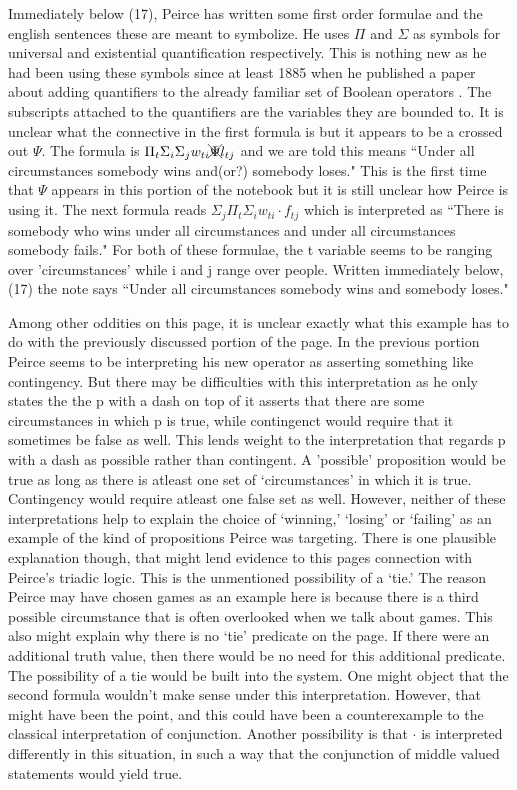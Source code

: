 \documentclass[12pt]{article}
\begin{document}
 Immediately below (17), Peirce has written some first order formulae and the english sentences these are meant to symbolize. He uses $\Pi$ and $\Sigma$ as symbols for universal and existential quantification respectively. This is nothing new as he had been using these symbols since at least 1885 when he published a paper about adding quantifiers to the already familiar set of Boolean operators \citep{peircealgebra}. The subscripts attached to the quantifiers are the variables they are bounded to. It is unclear what the connective in the first formula is but it appears to be a crossed out $\Psi$. The formula is $\Pi_{t} \Sigma_{i} \Sigma_{j} w_{ti} \xcancel{\Psi} l_{tj}$ and we are told this means ``Under all circumstances somebody wins and(or?) somebody loses." This is the first time that $\Psi$ appears in this portion of the notebook but it is still unclear how Peirce is using it. The next formula reads $\Sigma_{j} \Pi_{t} \Sigma_{i} w_{ti} \cdot f_{tj}$ which is interpreted as ``There is somebody who wins under all circumstances and under all circumstances somebody fails." For both of these formulae, the t variable seems to be ranging over 'circumstances' while i and j range over people. Written immediately below, (17) the note says ``Under all circumstances somebody wins and somebody loses."

Among other oddities on this page, it is unclear exactly what this example has to do with the previously discussed portion of the page. In the previous portion Peirce seems to be interpreting his new operator as asserting something like contingency. But there may be difficulties with this interpretation as he only states the the p with a dash on top of it asserts that there are some circumstances in which p is true, while contingenct would require that it sometimes be false as well. This lends weight to the interpretation that regards p with a dash as possible rather than contingent. A 'possible' proposition would be true as long as there is atleast one set of `circumstances' in which it is true. Contingency would require atleast one false set as well. However, neither of these interpretations help to explain the choice of `winning,' `losing' or `failing' as an example of the kind of propositions Peirce was targeting. There is one plausible explanation though, that might lend evidence to this pages connection with Peirce's triadic logic. This is the unmentioned possibility of a `tie.' The reason Peirce may have chosen games as an example here is because there is a third possible circumstance that is often overlooked when we talk about games. This also might explain why there is no `tie' predicate on the page. If there were an additional truth value, then there would be no need for this additional predicate. The possibility of a tie would be built into the system. One might object that the second formula wouldn't make sense under this interpretation. However, that might have been the point, and this could have been a counterexample to the classical interpretation of conjunction. Another possibility is that $\cdot$ is interpreted differently in this situation, in such a way that the conjunction of middle valued statements would yield true.
\end{document}
